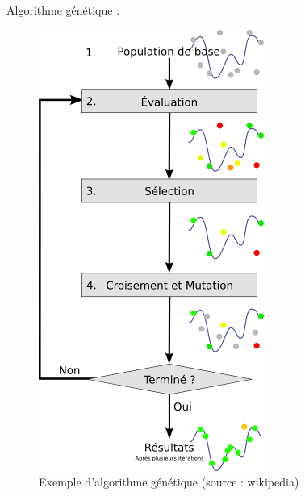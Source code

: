 \documentclass[8pt]{beamer}
\begin{document}
\begin{frame}
	Algorithme génétique :
	\begin{figure}
		\centering
		\includegraphics[width=.3\textwidth]{images/AG.png}
		\caption{Exemple d'algorithme génétique (source : wikipedia)}\label{fig:AG}
	\end{figure}
\end{frame}
\end{document}
